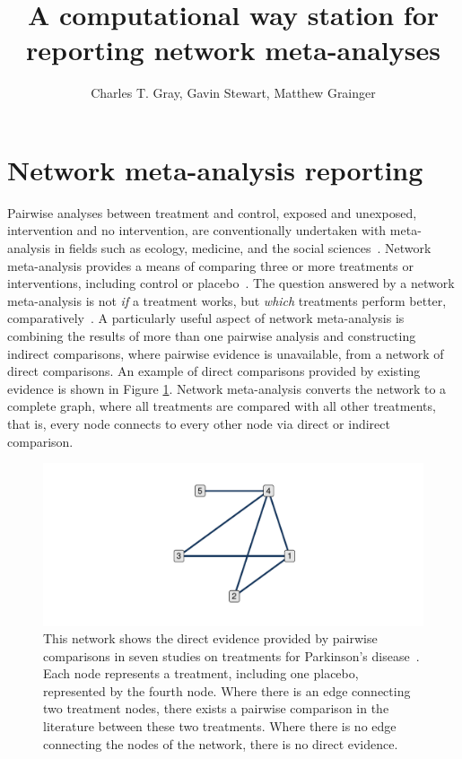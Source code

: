 \documentclass[12pt]{article}\usepackage[]{graphicx}\usepackage[]{color}
\title{A computational way station for reporting network meta-analyses}
\author{Charles T. Gray, Gavin Stewart, Matthew Grainger}
\makeatletter
\def\maxwidth{ %
  \ifdim\Gin@nat@width>\linewidth
    \linewidth
  \else
    \Gin@nat@width
  \fi
}
\newenvironment{knitrout}{}{} %
\makeatother
\begin{document}
\maketitle


\section{Network meta-analysis reporting}\label{sec:nma}


Pairwise analyses between treatment and control, exposed and unexposed, intervention and no intervention, are conventionally undertaken with meta-analysis in fields such as ecology, medicine, and the social sciences~\cite{borenstein_introduction_2011}. Network meta-analysis provides a means of comparing three or more treatments or interventions, including control or placebo~\cite{higgins2019cochrane}. The question answered by a network meta-analysis is not \emph{if} a treatment works, but \emph{which} treatments perform better, comparatively~\cite{harrer_doing_2019}. A particularly useful aspect of network meta-analysis is combining the results of more than one pairwise analysis and constructing indirect comparisons, where pairwise evidence is unavailable, from a network of direct comparisons. An example of direct comparisons provided by existing evidence is shown in Figure \ref{fig:network}. Network meta-analysis converts the network to a complete graph, where all treatments are compared with all other treatments, that is, every node connects to every other node via direct or indirect comparison.

\begin{figure}
\centering
\begin{knitrout}
\color{fgcolor}
\includegraphics[width=\maxwidth]{figure/unnamed-chunk-2-1} 

\end{knitrout}
\caption{This network shows the direct evidence provided by pairwise comparisons in seven studies on treatments for Parkinson's disease~\cite{phillippo_multinma_2020}. Each node represents a treatment, including one placebo, represented by the fourth node. Where there is an edge connecting two treatment nodes, there exists a pairwise comparison in the literature between these two treatments. Where there is no edge connecting the nodes of the network, there is no direct evidence.}
\label{fig:network}
\end{figure}
\end{document}

